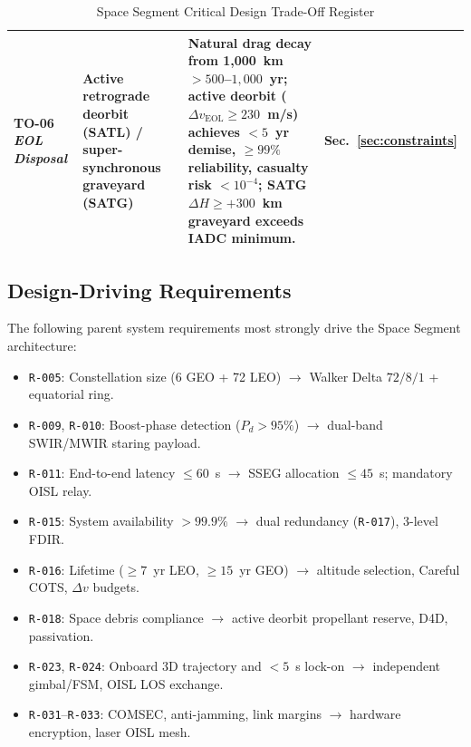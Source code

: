 \begin{table}[H]
{\begin{tabularx}{\textwidth}{|>{\raggedright\arraybackslash}p{2.4cm}|>{\raggedright\arraybackslash}p{3.0cm}|>{\raggedright\arraybackslash}X|>{\raggedright\arraybackslash}p{2.0cm}|}
    \textbf{TO-06} \newline \emph{EOL Disposal} & Active retrograde deorbit (SATL) / super-synchronous graveyard (SATG) & Natural drag decay from 1,000~km $> 500$--$1{,}000$~yr; active deorbit ($\Delta v_{\text{EOL}} \ge 230$~m/s) achieves $< 5$~yr demise, $\ge 99\%$ reliability, casualty risk $< 10^{-4}$; SATG $\Delta H \ge +300$~km graveyard exceeds IADC minimum. & Sec.~\ref{sec:constraints} \\ \hline
\end{tabularx}}
\caption{Space Segment Critical Design Trade-Off Register}
\end{table}

\subsection{Design-Driving Requirements}

The following parent system requirements most strongly drive the Space Segment architecture:
\begin{itemize}
    \item \texttt{R-005}: Constellation size (6 GEO + 72 LEO) $\rightarrow$ Walker Delta $72/8/1$ + equatorial ring.
    \item \texttt{R-009}, \texttt{R-010}: Boost-phase detection ($P_d > 95\%$) $\rightarrow$ dual-band SWIR/MWIR staring payload.
    \item \texttt{R-011}: End-to-end latency $\le 60$~s $\rightarrow$ SSEG allocation $\le 45$~s; mandatory OISL relay.
    \item \texttt{R-015}: System availability $> 99.9\%$ $\rightarrow$ dual redundancy (\texttt{R-017}), 3-level FDIR.
    \item \texttt{R-016}: Lifetime ($\ge 7$~yr LEO, $\ge 15$~yr GEO) $\rightarrow$ altitude selection, Careful COTS, $\Delta v$ budgets.
    \item \texttt{R-018}: Space debris compliance $\rightarrow$ active deorbit propellant reserve, D4D, passivation.
    \item \texttt{R-023}, \texttt{R-024}: Onboard 3D trajectory and $< 5$~s lock-on $\rightarrow$ independent gimbal/FSM, OISL LOS exchange.
    \item \texttt{R-031}--\texttt{R-033}: COMSEC, anti-jamming, link margins $\rightarrow$ hardware encryption, laser OISL mesh.
\end{itemize}
